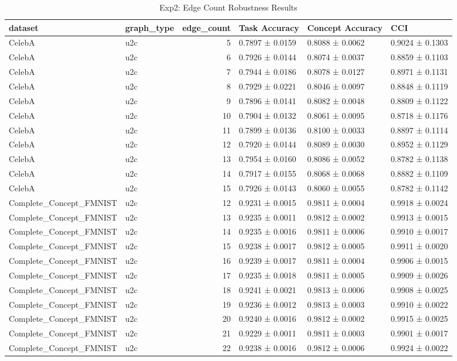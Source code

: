 \begin{table}
\caption{Exp2: Edge Count Robustness Results}
\label{tab:exp2_edge_count_results}
\begin{tabular}{llrlll}
\toprule
dataset & graph_type & edge_count & Task Accuracy & Concept Accuracy & CCI \\
\midrule
CelebA & u2c & 5 & 0.7897 ± 0.0159 & 0.8088 ± 0.0062 & 0.9024 ± 0.1303 \\
CelebA & u2c & 6 & 0.7926 ± 0.0144 & 0.8074 ± 0.0037 & 0.8859 ± 0.1103 \\
CelebA & u2c & 7 & 0.7944 ± 0.0186 & 0.8078 ± 0.0127 & 0.8971 ± 0.1131 \\
CelebA & u2c & 8 & 0.7929 ± 0.0221 & 0.8046 ± 0.0097 & 0.8848 ± 0.1119 \\
CelebA & u2c & 9 & 0.7896 ± 0.0141 & 0.8082 ± 0.0048 & 0.8809 ± 0.1122 \\
CelebA & u2c & 10 & 0.7904 ± 0.0132 & 0.8061 ± 0.0095 & 0.8718 ± 0.1176 \\
CelebA & u2c & 11 & 0.7899 ± 0.0136 & 0.8100 ± 0.0033 & 0.8897 ± 0.1114 \\
CelebA & u2c & 12 & 0.7920 ± 0.0144 & 0.8089 ± 0.0030 & 0.8952 ± 0.1129 \\
CelebA & u2c & 13 & 0.7954 ± 0.0160 & 0.8086 ± 0.0052 & 0.8782 ± 0.1138 \\
CelebA & u2c & 14 & 0.7917 ± 0.0155 & 0.8068 ± 0.0068 & 0.8882 ± 0.1109 \\
CelebA & u2c & 15 & 0.7926 ± 0.0143 & 0.8060 ± 0.0055 & 0.8782 ± 0.1142 \\
Complete_Concept_FMNIST & u2c & 12 & 0.9231 ± 0.0015 & 0.9811 ± 0.0004 & 0.9918 ± 0.0024 \\
Complete_Concept_FMNIST & u2c & 13 & 0.9235 ± 0.0011 & 0.9812 ± 0.0002 & 0.9913 ± 0.0015 \\
Complete_Concept_FMNIST & u2c & 14 & 0.9235 ± 0.0016 & 0.9811 ± 0.0006 & 0.9910 ± 0.0017 \\
Complete_Concept_FMNIST & u2c & 15 & 0.9238 ± 0.0017 & 0.9812 ± 0.0005 & 0.9911 ± 0.0020 \\
Complete_Concept_FMNIST & u2c & 16 & 0.9239 ± 0.0017 & 0.9811 ± 0.0004 & 0.9906 ± 0.0015 \\
Complete_Concept_FMNIST & u2c & 17 & 0.9235 ± 0.0018 & 0.9811 ± 0.0005 & 0.9909 ± 0.0026 \\
Complete_Concept_FMNIST & u2c & 18 & 0.9241 ± 0.0021 & 0.9813 ± 0.0006 & 0.9908 ± 0.0025 \\
Complete_Concept_FMNIST & u2c & 19 & 0.9236 ± 0.0012 & 0.9813 ± 0.0003 & 0.9910 ± 0.0022 \\
Complete_Concept_FMNIST & u2c & 20 & 0.9240 ± 0.0016 & 0.9812 ± 0.0002 & 0.9915 ± 0.0025 \\
Complete_Concept_FMNIST & u2c & 21 & 0.9229 ± 0.0011 & 0.9811 ± 0.0003 & 0.9901 ± 0.0017 \\
Complete_Concept_FMNIST & u2c & 22 & 0.9238 ± 0.0016 & 0.9812 ± 0.0006 & 0.9924 ± 0.0022 \\
\bottomrule
\end{tabular}
\end{table}
